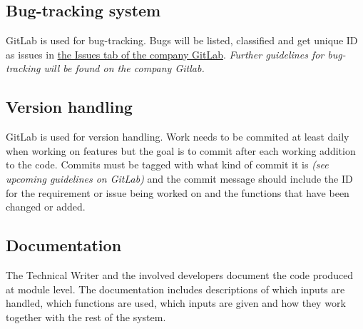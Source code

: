 \subsection{Bug-tracking system}
GitLab is used for bug-tracking. Bugs will be listed, classified and get unique ID as issues in \href{https://gitlab.liu.se/tddc88-company-1-2021/deploy/-/issues}{the Issues tab of the company GitLab}. \emph{Further guidelines for bug-tracking will be found on the company Gitlab.}

\subsection{Version handling}
GitLab is used for version handling. Work needs to be commited at least daily when working on features but the goal is to commit after each working addition to the code. Commits must be tagged with what kind of commit it is \emph{(see upcoming guidelines on GitLab)} and the commit message should include the ID for the requirement or issue being worked on and the functions that have been changed or added.

\subsection{Documentation}
The Technical Writer and the involved developers document the code produced at module level. The documentation includes descriptions of which inputs are handled, which functions are used, which inputs are given and how they work together with the rest of the system.

